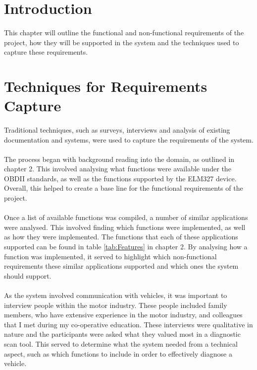 \section{Introduction}
	\paragraph{}{
	This chapter will outline the functional and non-functional requirements of the project, how they will be supported in the system and the techniques used to capture these requirements.
	}		

\section{Techniques for Requirements Capture}	
	\paragraph{}{
	Traditional techniques\cite{ReqEng}, such as surveys, interviews and analysis of existing documentation and systems, were used to capture the requirements of the system.
	}
	\paragraph{}{
	The process began with background reading into the domain, as outlined in chapter 2. This involved analysing what functions were available under the OBDII standards, as well as the functions supported by the ELM327 device. Overall, this helped to create a base line for the functional requirements of the project.
	}	
	\paragraph{}{
	Once a list of available functions was compiled, a number of similar applications were analysed. This involved finding which functions were implemented, as well as how they were implemented. The functions that each of these applications supported can be found in table \ref{tab:Features} in chapter 2. By analysing how a function was implemented, it served to highlight which non-functional requirements these similar applications supported and which ones the system should support.
	}
	\paragraph{}{
	As the system involved communication with vehicles, it was important to interview people within the motor industry. These people included family members, who have extensive experience in the motor industry, and colleagues that I met during my co-operative education. These interviews were qualitative in nature and the participants were asked what they valued most in a diagnostic scan tool. This served to determine what the system needed from a technical aspect, such as which functions to include in order to effectively diagnose a vehicle.  
	}
